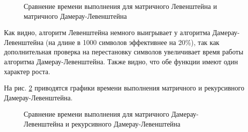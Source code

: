 \documentclass[a4paper,12pt]{article}
\begin{document}
        \begin{figure}[h!]
            \caption{Сравнение времени выполнения для матричного Левенштейна и матричного Дамерау-Левенштейна}
            \label{fig:gtaf_1}
        \end{figure}
        
        Как видно, алгоритм Левенштейна немного выигрывает у алгоритма Дамерау-Левенштейна (на длине в 1000 символов эффективнее на 20\%), так как дополнительная проверка на перестановку символов увеличивает время работы алгоритма Дамерау-Левенштейна. Также видно, что обе функции имеют один характер роста.
        
         На рис. \ref{fig:graf_2} приводятся графики времени выполнения матричного и рекурсивного Дамерау-Левенштейна.
         
        \begin{figure}[h!]
            \caption{Сравнение времени выполнения для матричного Дамерау-Левенштейна и рекурсивного Дамерау-Левенштейна}
            \label{fig:graf_2}
        \end{figure}
        
\end{document}

